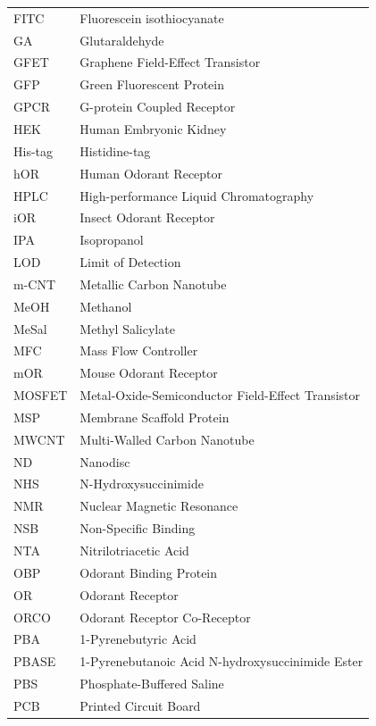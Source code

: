 \documentclass[
  a4paper,
]{scrbook}
\begin{document}
\newpage
\fancyhf{} %
\thispagestyle{fancy} %
\renewcommand{\headrulewidth}{0pt}
\fancyfoot[L]{\thepage} %
\begin{table}[H]
  \begin{tabular}{@{}p{} p{}@{}}  %
    FITC  & Fluorescein isothiocyanate  \\[5pt]
    GA  & Glutaraldehyde  \\[5pt]
    GFET  & Graphene Field-Effect Transistor  \\[5pt]
    GFP  & Green Fluorescent Protein  \\[5pt]
    GPCR  & G-protein Coupled Receptor  \\[5pt]
    HEK  & Human Embryonic Kidney  \\[5pt]
    His-tag  & Histidine-tag  \\[5pt]
    hOR  & Human Odorant Receptor  \\[5pt]
    HPLC  & High-performance Liquid Chromatography   \\[5pt]
    iOR  & Insect Odorant Receptor  \\[5pt]
    IPA  & Isopropanol  \\[5pt]
    LOD  & Limit of Detection  \\[5pt]
    m-CNT  & Metallic Carbon Nanotube   \\[5pt]
    MeOH  & Methanol   \\[5pt]
    MeSal  & Methyl Salicylate   \\[5pt]
    MFC  & Mass Flow Controller   \\[5pt]
    mOR  & Mouse Odorant Receptor  \\[5pt]
    MOSFET  & Metal-Oxide-Semiconductor Field-Effect Transistor  \\[5pt]
    MSP  & Membrane Scaffold Protein  \\[5pt]
    MWCNT  & Multi-Walled Carbon Nanotube  \\[5pt]
    ND  & Nanodisc  \\[5pt]
    NHS  & N-Hydroxysuccinimide  \\[5pt]
    NMR  & Nuclear Magnetic Resonance  \\[5pt]
    NSB  & Non-Specific Binding   \\[5pt]
    NTA  & Nitrilotriacetic Acid   \\[5pt]
    OBP  & Odorant Binding Protein  \\[5pt]
    OR  & Odorant Receptor  \\[5pt]
    ORCO  & Odorant Receptor Co-Receptor  \\[5pt]
    PBA  & 1-Pyrenebutyric Acid  \\[5pt]
    PBASE  & 1-Pyrenebutanoic Acid N-hydroxysuccinimide Ester  \\[5pt]
    PBS  & Phosphate-Buffered Saline  \\[5pt]
    PCB  & Printed Circuit Board   \\[5pt]
  \end{tabular}
\end{table}
\end{document}
